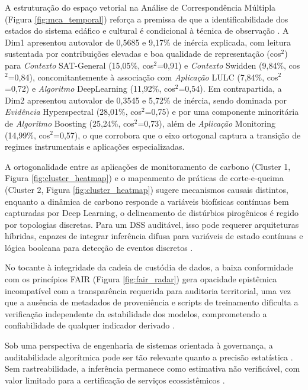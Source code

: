 A estruturação do espaço vetorial na Análise de Correspondência Múltipla (Figura \ref{fig:mca_temporal}) reforça a premissa de que a identificabilidade dos estados do sistema edáfico e cultural é condicional à técnica de observação \cite{Reichstein2019}. A Dim1 apresentou autovalor de 0,5685 e 9,17\% de inércia explicada, com leitura sustentada por contribuições elevadas e boa qualidade de representação (cos$^2$) para \textit{Contexto} SAT-General (15,05\%, cos$^2$=0,91) e \textit{Contexto} Swidden (9,84\%, cos$^2$=0,84), concomitantemente à associação com \textit{Aplicação} LULC (7,84\%, cos$^2$=0,72) e \textit{Algoritmo} DeepLearning (11,92\%, cos$^2$=0,54). Em contrapartida, a Dim2 apresentou autovalor de 0,3545 e 5,72\% de inércia, sendo dominada por \textit{Evidência} Hyperspectral (28,01\%, cos$^2$=0,75) e por uma componente minoritária de \textit{Algoritmo} Boosting (25,24\%, cos$^2$=0,73), além de \textit{Aplicação} Monitoring (14,99\%, cos$^2$=0,57), o que corrobora que o eixo ortogonal captura a transição de regimes instrumentais e aplicações especializadas.

A ortogonalidade entre as aplicações de monitoramento de carbono (Cluster 1, Figura \ref{fig:cluster_heatmap}) e o mapeamento de práticas de corte-e-queima (Cluster 2, Figura \ref{fig:cluster_heatmap}) sugere mecanismos causais distintos, enquanto a dinâmica de carbono responde a variáveis biofísicas contínuas bem capturadas por Deep Learning, o delineamento de distúrbios pirogênicos é regido por topologias discretas. Para um DSS auditável, isso pode requerer arquiteturas híbridas, capazes de integrar inferência difusa para variáveis de estado contínuas e lógica booleana para detecção de eventos discretos \cite{Akram2026}.

No tocante à integridade da cadeia de custódia de dados, a baixa conformidade com os princípios FAIR (Figura \ref{fig:fair_radar}) gera opacidade epistêmica incompatível com a transparência requerida para auditoria territorial, uma vez que a ausência de metadados de proveniência e scripts de treinamento dificulta a verificação independente da estabilidade dos modelos, comprometendo a confiabilidade de qualquer indicador derivado \cite{Tuia2021,Samuel2021,Ivie2018,Zheng2024}. 

Sob uma perspectiva de engenharia de sistemas orientada à governança, a auditabilidade algorítmica pode ser tão relevante quanto a precisão estatística \cite{Rudin2019}. Sem rastreabilidade, a inferência permanece como estimativa não verificável, com valor limitado para a certificação de serviços ecossistêmicos \cite{Tuia2021}.

